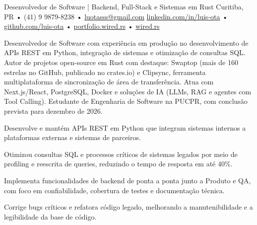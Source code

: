 




\cvheader
  {Desenvolvedor de Software | Backend, Full-Stack e Sistemas em Rust}
  {Curitiba, PR • (41) 9 9879-8238 • \href{mailto:luotasss@gmail.com}{luotasss@gmail.com}}
  {\href{https://linkedin.com/in/luis-ota}{linkedin.com/in/luis-ota} • \href{https://github.com/luis-ota}{github.com/luis-ota} • \href{https://portfolio.wired.rs}{portfolio.wired.rs} • \href{https://wired.rs}{wired.rs}}

Desenvolvedor de Software com experiência em produção no desenvolvimento de APIs REST em Python, integração de sistemas e otimização de consultas SQL. Autor de projetos open-source em Rust com destaque: Swaptop (mais de 160 estrelas no GitHub, publicado no crates.io) e Clipsync, ferramenta multiplataforma de sincronização de área de transferência. Atua com Next.js/React, PostgreSQL, Docker e soluções de IA (LLMs, RAG e agentes com Tool Calling). Estudante de Engenharia de Software na PUCPR, com conclusão prevista para dezembro de 2026.



\begin{cvbullets}
  \item Desenvolve e mantém APIs REST em Python que integram sistemas internos a plataformas externas e sistemas de parceiros.
  \item Otimizou consultas SQL e processos críticos de sistemas legados por meio de profiling e reescrita de queries, reduzindo o tempo de resposta em até 40\%.
  \item Implementa funcionalidades de backend de ponta a ponta junto a Produto e QA, com foco em confiabilidade, cobertura de testes e documentação técnica.
  \item Corrige bugs críticos e refatora código legado, melhorando a manutenibilidade e a legibilidade da base de código.
\end{cvbullets}


